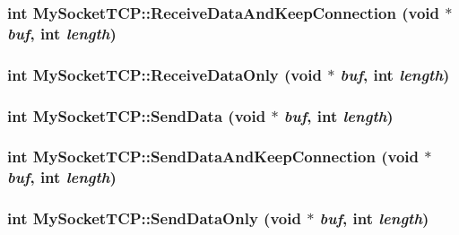 \subsubsection{\setlength{\rightskip}{0pt plus 5cm}int My\-Socket\-TCP::Receive\-Data\-And\-Keep\-Connection (void $\ast$ {\em buf}, int {\em length})}\label{classMySocketTCP_375171791400d7d60804b56852ff3611}


\subsubsection{\setlength{\rightskip}{0pt plus 5cm}int My\-Socket\-TCP::Receive\-Data\-Only (void $\ast$ {\em buf}, int {\em length})}\label{classMySocketTCP_a8b6322845e72ffc6da44db774b19d73}


\subsubsection{\setlength{\rightskip}{0pt plus 5cm}int My\-Socket\-TCP::Send\-Data (void $\ast$ {\em buf}, int {\em length})}\label{classMySocketTCP_7777e909e20c47d38e32a174b0eae425}


\subsubsection{\setlength{\rightskip}{0pt plus 5cm}int My\-Socket\-TCP::Send\-Data\-And\-Keep\-Connection (void $\ast$ {\em buf}, int {\em length})}\label{classMySocketTCP_1641bc23538af6849efeb195a1b33626}


\subsubsection{\setlength{\rightskip}{0pt plus 5cm}int My\-Socket\-TCP::Send\-Data\-Only (void $\ast$ {\em buf}, int {\em length})}\label{classMySocketTCP_2f9ce7233ee4903127039d43b4a34886}




